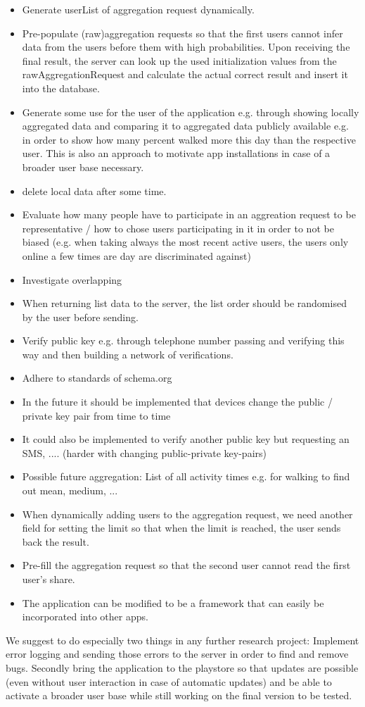 \begin{itemize}
	\item Generate userList of aggregation request dynamically.
	\item Pre-populate (raw)aggregation requests so that the first users cannot infer data from the users before them with high probabilities. Upon receiving the final result, the server can look up the used initialization values from the rawAggregationRequest and calculate the actual correct result and insert it into the database.
	\item Generate some use for the user of the application e.g. through showing locally aggregated data and comparing it to aggregated data publicly available e.g. in order to show how many percent walked more this day than the respective user. This is also an approach to motivate app installations in case of a broader user base necessary.
	\item delete local data after some time.
	\item Evaluate how many people have to participate in an aggreation request to be representative / how to chose users participating in it in order to not be biased (e.g. when taking always the most recent active users, the users only online a few times are day are discriminated against)
	\item Investigate overlapping
	\item When returning list data to the server, the list order should be randomised by the user before sending.
	\item Verify public key e.g. through telephone number passing and verifying this way and then building a network of verifications.
	\item Adhere to standards of schema.org
	\item In the future it should be implemented that devices change the public / private key pair from time to time
	\item It could also be implemented to verify another public key but requesting an SMS, .... (harder with changing public-private key-pairs)
	\item Possible future aggregation: List of all activity times e.g. for walking to find out mean, medium, ...
	\item When dynamically adding users to the aggregation request, we need another field for setting the limit so that when the limit is reached, the user sends back the result.
	\item Pre-fill the aggregation request so that the second user cannot read the first user's share.
	\item The application can be modified to be a framework that can easily be incorporated into other apps.
\end{itemize}
We suggest to do especially two things in any further research project: Implement error logging and sending those errors to the server in order to find and remove bugs. Secondly bring the application to the playstore so that updates are possible (even without user interaction in case of automatic updates) and be able to activate a broader user base while still working on the final version to be tested.

